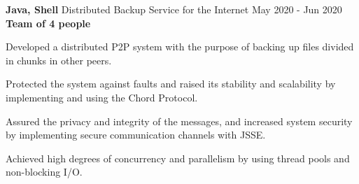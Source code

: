 \cventry
  {\textbf{Java, Shell}} %
  {Distributed Backup Service for the Internet \href{https://github.com/EduRibeiro00/DistBackupService-feup-sdis}{\faExternalLink}} %
  {May 2020 - Jun 2020} %
  {\textbf{Team of 4 people}} %
  {
    \begin{cvitems} %
      \item {Developed a distributed P2P system with the purpose of backing up files divided in chunks in other peers.}
      \item{Protected the system against faults and raised its stability and scalability by implementing and using the Chord Protocol.}
      \item {Assured the privacy and integrity of the messages, and increased system security by implementing secure communication channels with JSSE.}
      \item {Achieved high degrees of concurrency and parallelism by using thread pools and non-blocking I/O.}
    \end{cvitems}
  }